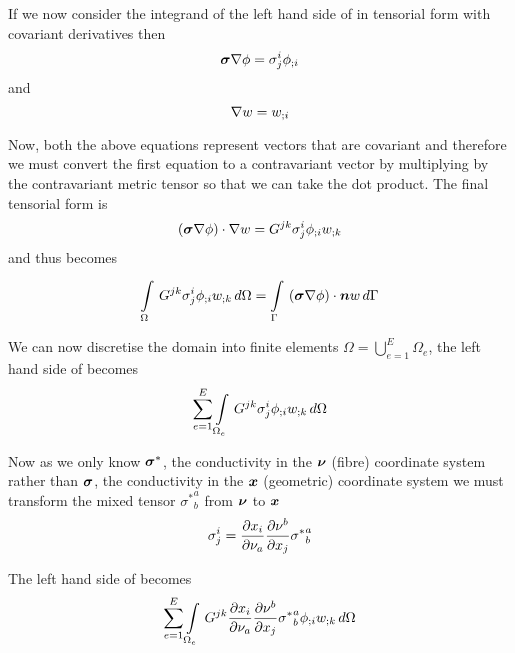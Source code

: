 If we now consider the integrand of the left hand side of
 in tensorial form with covariant
derivatives then
\begin{equation}
  \boldsymbol{\sigma}\nabla\phi = \sigma^{i}_{j} {\phi}_{;i} 
\end{equation}
and
\begin{equation}
  \nabla w =  {w}_{;i} 
\end{equation}

Now, both the above equations represent vectors that are covariant and therefore we must convert the
first equation to a contravariant vector by multiplying by the contravariant
metric tensor so that we can take the dot product. The final tensorial form is
\begin{equation}
  \left( \boldsymbol{\sigma}\nabla\phi \right)\cdot\nabla w = G^{jk}\sigma^{i}_{j} {\phi}_{;i}  {w}_{;k} 
\end{equation}
and thus  becomes
\begin{equation}
  \gint{\Omega}{}{G^{jk}\sigma^{i}_{j}\covarderiv{\phi}{i}\covarderiv{w}{k}}{\Omega}=
  \gint{\Gamma}{}{\dotprod{\pbrac{\tensor{\sigma}\grad\phi}}{\vect{n}w}}{\Gamma}
  \label{eqn:Laplaceweightedresidualtensorform}
\end{equation}

We can now discretise the domain into finite elements \ie $\Omega=
\displaystyle{\bigcup_{e=1}^{E}}\Omega_{e}$, the left hand side of
 becomes
\begin{equation}
  \displaystyle\sum_{e=1}^{E}  \displaystyle\int\limits_{\Omega_{e}}^{} \,G^{jk}\sigma^{i}_{j} {\phi}_{;i}  {w}_{;k} \,d\Omega 
\end{equation}

Now as we only know $\boldsymbol{\sigma}^{*}$, the conductivity in the
$\vect{\nu}$ (fibre) coordinate system rather than $\boldsymbol{\sigma}$, the
conductivity in the $\vect{x}$ (geometric) coordinate system we must transform the mixed
tensor ${\sigma^{*}}^{a}_{b}$ from $\vect{\nu}$ to $\vect{x}$
\begin{equation}
  \sigma^{i}_{j}= \dfrac{\partial x_{i}}{\partial \nu_{a}}  \dfrac{\partial \nu^{b}}{\partial x_{j}} {\sigma^{*}}^{a}_{b}
\end{equation}

The left hand side of  becomes
\begin{equation}
  \displaystyle\sum_{e=1}^{E}  \displaystyle\int\limits_{\Omega_{e}}^{} \,G^{jk} \dfrac{\partial x_{i}}{\partial \nu_{a}}  \dfrac{\partial \nu^{b}}{\partial x_{j}} {\sigma^{*}}^{a}_{b} {\phi}_{;i}  {w}_{;k} \,d\Omega 
\end{equation}

